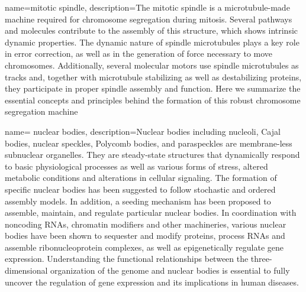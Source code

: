  {
	name={mitotic spindle},
	description={The mitotic spindle is a microtubule-made machine required for chromosome segregation during mitosis. Several pathways and molecules contribute to the assembly of this structure, which shows intrinsic dynamic properties. The dynamic nature of spindle microtubules plays a key role in error correction, as well as in the generation of force necessary to move chromosomes. Additionally, several molecular motors use spindle microtubules as tracks and, together with microtubule stabilizing as well as destabilizing proteins, they participate in proper spindle assembly and function. Here we summarize the essential concepts and principles behind the formation of this robust chromosome segregation machine\cite{bradshaw2015encyclopedia}}}

 {
	name= {nuclear bodies},
	description={Nuclear bodies including nucleoli, Cajal bodies, nuclear speckles, Polycomb bodies, and paraspeckles are membrane-less subnuclear organelles. They are steady-state structures that dynamically respond to basic physiological processes as well as various forms of stress, altered metabolic conditions and alterations in cellular signaling. The formation of specific nuclear bodies has been suggested to follow stochastic and ordered assembly models. In addition, a seeding mechanism has been proposed to assemble, maintain, and regulate particular nuclear bodies. In coordination with noncoding RNAs, chromatin modifiers and other machineries, various nuclear bodies have been shown to sequester and modify proteins, process RNAs and assemble ribonucleoprotein complexes, as well as epigenetically regulate gene expression. Understanding the functional relationships between the three-dimensional organization of the genome and nuclear bodies is essential to fully uncover the regulation of gene expression and its implications in human diseases.\cite{mao2011biogenesis}}}




